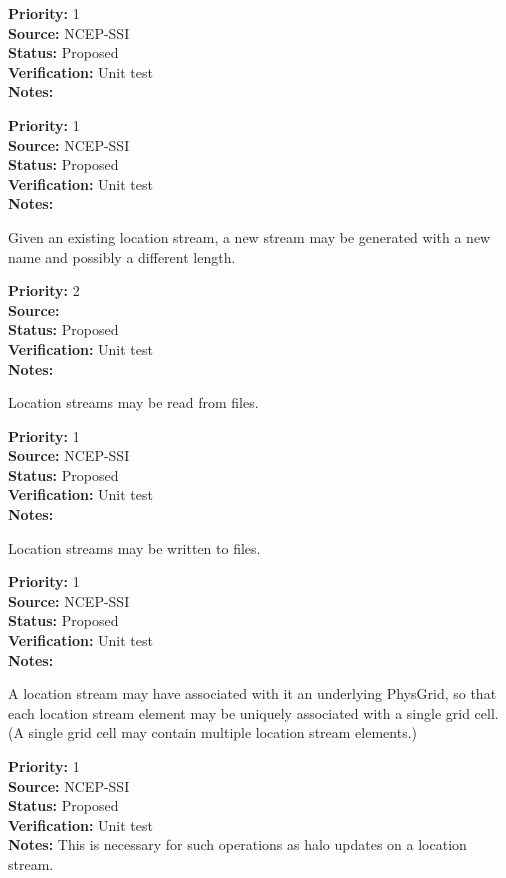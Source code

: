 \begin{reqlist}
{\bf Priority:} 1 \\
{\bf Source:} NCEP-SSI \\
{\bf Status:} Proposed \\
{\bf Verification:} Unit test \\
{\bf Notes:} 
\end{reqlist}

\begin{reqlist}
{\bf Priority:} 1 \\
{\bf Source:} NCEP-SSI \\
{\bf Status:} Proposed \\
{\bf Verification:} Unit test \\
{\bf Notes:} 
\end{reqlist}

Given an existing location stream, a new stream may be generated with a new name and
possibly a different length.
\begin{reqlist}
{\bf Priority:} 2 \\
{\bf Source:} \\
{\bf Status:} Proposed \\
{\bf Verification:} Unit test \\
{\bf Notes:} 
\end{reqlist}

Location streams may be read from files.
\begin{reqlist}
{\bf Priority:} 1 \\
{\bf Source:} NCEP-SSI \\
{\bf Status:} Proposed \\
{\bf Verification:} Unit test \\
{\bf Notes:} 
\end{reqlist}

Location streams may be written to files.
\begin{reqlist}
{\bf Priority:} 1 \\
{\bf Source:} NCEP-SSI \\
{\bf Status:} Proposed \\
{\bf Verification:} Unit test \\
{\bf Notes:} 
\end{reqlist}

A location stream may have associated with it an underlying PhysGrid, so that each
location stream element may be uniquely associated with a single grid cell. (A single
grid cell may contain multiple location stream elements.)
\begin{reqlist}
{\bf Priority:} 1 \\
{\bf Source:} NCEP-SSI \\
{\bf Status:} Proposed \\
{\bf Verification:} Unit test \\
{\bf Notes:} This is necessary for such operations as halo updates on a location
stream.
\end{reqlist}

